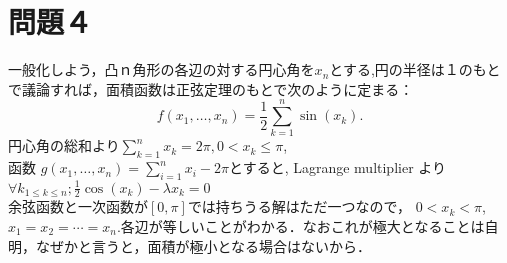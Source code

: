 \documentclass[dvipdfmx]{jreport}
\begin{document}
\section{問題４}%
\label{sec:問題４}
一般化しよう，凸ｎ角形の各辺の対する円心角を$x_n$とする,円の半径は１のもとで議論すれば，面積函数は正弦定理のもとで次のように定まる： 
\[
f(x_1, \ldots ,x_n) = \frac{1}{2}\sum_{k=1}^{n} \sin (x_k)
.\] 
円心角の総和より$\sum^{n}_{k=1} x_k = 2 \pi,0<x_k\le \pi $, \\
函数 $g(x_1,\ldots,x_n) =\sum^{n}_{i=1}x_i -2\pi $とすると, Lagrange multiplier より $\forall k_{1\le k \le n} ; \frac{1}{2}\cos(x_k) - \lambda x_k = 0$\\
余弦函数と一次函数が$[0,\pi]$では持ちうる解はただ一つなので， $0<x_k<\pi$,  $x_1=x_2=\cdots=x_n$.各辺が等しいことがわかる．なおこれが極大となることは自明，なぜかと言うと，面積が極小となる場合はないから．
\end{document}
